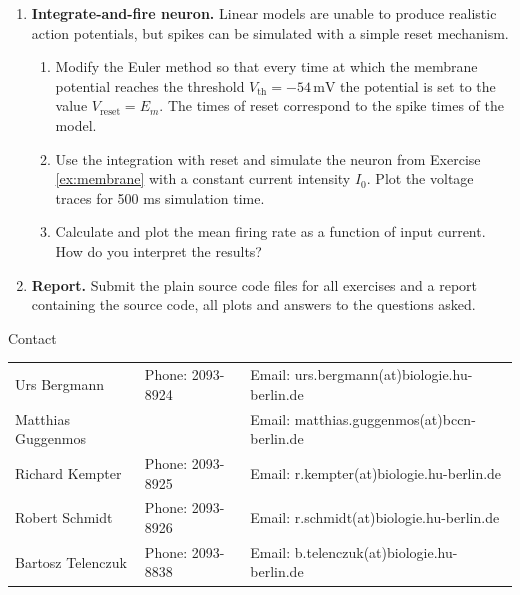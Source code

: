 \documentclass[12pt, a4]{article}
\begin{document}
\begin{enumerate}
    \item \textbf{Integrate-and-fire neuron.} Linear models are unable to 
	produce realistic action potentials, but
        spikes can be simulated with a simple reset mechanism.
        \begin{enumerate}

            \item Modify the Euler method so that every time at which the 
	    membrane potential reaches the threshold 
	    $V_\mathrm{th}=-54\,\mathrm{mV}$ the potential is set to the value
            $V_\mathrm{reset}=E_m$. The times of reset correspond to the spike 
	    times of the model.

            \item Use the integration with reset and simulate the neuron from
            Exercise \ref{ex:membrane} with a constant current intensity
            $I_0$. Plot the voltage traces for 500 ms simulation time.

            \item Calculate and plot the mean firing rate as a function of
            input current. How do you interpret the results?
        \end{enumerate}

    \item {\bf Report.} Submit the plain source code files for all exercises
        and a report containing the source code, all plots and answers to the
        questions asked.
\end{enumerate}

\vfill
\centerline{\CAP Contact}
\CAP

\begin{tabular}{lll}
Urs Bergmann & Phone: 2093-8924 & Email:
urs.bergmann(at)biologie.hu-berlin.de \\
Matthias Guggenmos & & Email: matthias.guggenmos(at)bccn-berlin.de \\
Richard Kempter \hfill & Phone: 2093-8925 \hfill & Email:
r.kempter(at)biologie.hu-berlin.de \\
Robert Schmidt & Phone: 2093-8926 & Email: r.schmidt(at)biologie.hu-berlin.de
\\
Bartosz Telenczuk & Phone: 2093-8838 & Email:
b.telenczuk(at)biologie.hu-berlin.de \\
\end{tabular}
\end{document}
